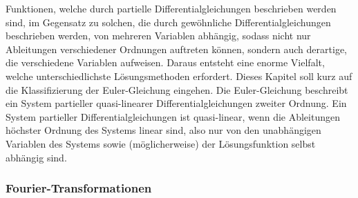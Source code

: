 Funktionen, welche durch partielle Differentialgleichungen beschrieben werden sind, im Gegensatz zu solchen, die durch gewöhnliche Differentialgleichungen beschrieben werden, von mehreren Variablen abhängig, sodass nicht nur Ableitungen verschiedener Ordnungen auftreten können, sondern auch derartige, die verschiedene Variablen aufweisen. Daraus entsteht eine enorme Vielfalt, welche unterschiedlichste Lösungsmethoden erfordert. Dieses Kapitel soll kurz auf die Klassifizierung der Euler-Gleichung eingehen.
Die Euler-Gleichung beschreibt ein System partieller quasi-linearer Differentialgleichungen zweiter Ordnung. Ein System partieller Differentialgleichungen ist quasi-linear, wenn die Ableitungen höchster Ordnung des Systems linear sind, also nur von den unabhängigen Variablen des Systems sowie (möglicherweise) der Lösungsfunktion selbst abhängig sind. 

\subsubsection{Fourier-Transformationen}

